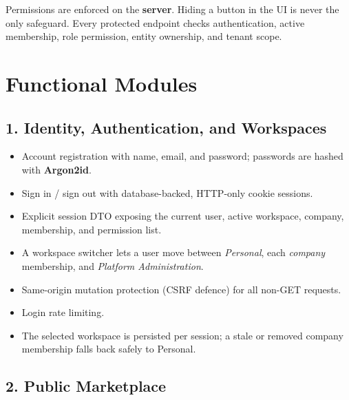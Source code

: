 \documentclass[11pt,a4paper]{article}
\begin{document}
\begin{notebox}
  Permissions are enforced on the \textbf{server}. Hiding a button in the UI is never the only safeguard. Every protected endpoint checks authentication, active membership, role permission, entity ownership, and tenant scope.
\end{notebox}

\section{Functional Modules}
\label{sec:modules}

\subsection{1. Identity, Authentication, and Workspaces}
\label{sec:auth}

\begin{itemize}[leftmargin=2em, itemsep=2pt]
  \item Account registration with name, email, and password; passwords are hashed with \textbf{Argon2id}.
  \item Sign in / sign out with database-backed, HTTP-only cookie sessions.
  \item Explicit session DTO exposing the current user, active workspace, company, membership, and permission list.
  \item A workspace switcher lets a user move between \emph{Personal}, each \emph{company} membership, and \emph{Platform Administration}.
  \item Same-origin mutation protection (CSRF defence) for all non-GET requests.
  \item Login rate limiting.
  \item The selected workspace is persisted per session; a stale or removed company membership falls back safely to Personal.
\end{itemize}

\subsection{2. Public Marketplace}
\label{sec:marketplace}
\end{document}
